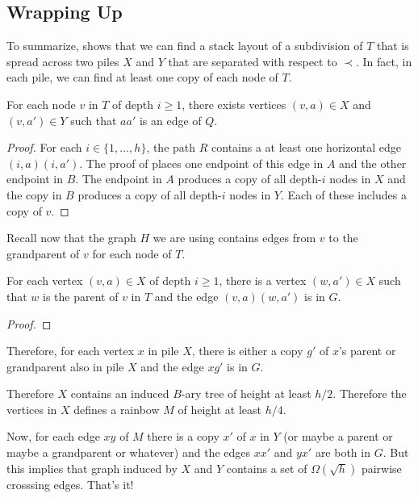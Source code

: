 \documentclass[kpfonts]{patmorin}
\begin{document}
\subsection*{Wrapping Up}

To summarize,  shows that we can find a stack layout of a subdivision of $T$ that is spread across two piles $X$ and $Y$ that are separated with respect to $\prec$.  In fact, in each pile, we can find at least one copy of each node of $T$.

\begin{lem}
    For each node $v$ in $T$ of depth $i\ge 1$, there exists vertices $(v,a)\in X$ and $(v,a')\in Y$ such that $aa'$ is an edge of $Q$.
\end{lem}

\begin{proof}
    For each $i\in\{1,\ldots,h\}$, the path $R$ contains a at least one horizontal edge $(i,a)(i,a')$.  The proof of  places one endpoint of this edge in $A$ and the other endpoint in $B$.  The endpoint in $A$ produces a copy of all depth-$i$ nodes in $X$ and the copy in $B$ produces a copy of all depth-$i$ nodes in $Y$.  Each of these includes a copy of $v$.
\end{proof}

Recall now that the graph $H$ we are using contains edges from $v$ to the grandparent of $v$ for each node of $T$.

\begin{lem}
    For each vertex $(v,a)\in X$ of depth $i\ge 1$, there is a vertex $(w,a')\in X$ such that $w$ is the parent of $v$ in $T$ and the edge $(v,a)(w,a')$ is in $G$.
\end{lem}

\begin{proof}

\end{proof}


Therefore, for each vertex $x$ in pile $X$, there is either a copy $g'$ of $x$'s parent or grandparent also in pile $X$ and the edge $xg'$ is in $G$.











Therefore $X$ contains an induced $B$-ary tree of height at least $h/2$.  Therefore the vertices in $X$ defines a rainbow $M$ of height at least $h/4$.

Now, for each edge $xy$ of $M$ there is a copy $x'$ of $x$ in $Y$ (or maybe a parent or maybe a grandparent or whatever) and the edges $xx'$ and $yx'$ are both in $G$.  But this implies that graph induced by $X$ and $Y$ contains a set of $\Omega(\sqrt{h})$ pairwise crosssing edges.  That's it!
\end{document}
